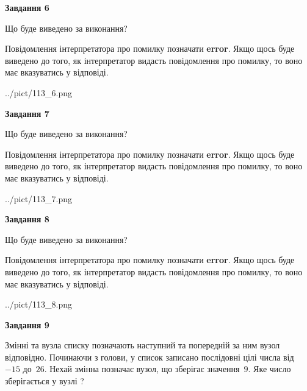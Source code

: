 \documentclass[12pt, ukrainian]{article}
\begin{document}
{\begin {large}
{\begin {center}\textbf{Завдання 6}\end {center}}\par
Що буде виведено за виконання?

Повідомлення інтерпретатора про помилку позначати \textbf{error}.
Якщо щось буде виведено до того, як інтерпретатор видасть повідомлення про помилку, 
то воно має вказуватись у відповіді. \par


\begin{center}
	{../pict/113_6.png}
\end{center}
\newpage

{\begin {center}\textbf{Завдання 7}\end {center}}\par
Що буде виведено за виконання?

Повідомлення інтерпретатора про помилку позначати \textbf{error}.
Якщо щось буде виведено до того, як інтерпретатор видасть повідомлення про помилку, 
то воно має вказуватись у відповіді. \par


\begin{center}
	{../pict/113_7.png}
\end{center}
\newpage

{\begin {center}\textbf{Завдання 8}\end {center}}\par
Що буде виведено за виконання?

Повідомлення інтерпретатора про помилку позначати \textbf{error}.
Якщо щось буде виведено до того, як інтерпретатор видасть повідомлення про помилку, 
то воно має вказуватись у відповіді. \par


\begin{center}
	{../pict/113_8.png}
\end{center}
\newpage

{\begin {center}\textbf{Завдання 9}\end {center}}\par
Змінні  та  вузла списку позначають наступний та попередній за ним вузол відповідно. Починаючи з голови, у список записано послідовні цілі числа від~$-15$ до~$26$. Нехай змінна  позначає вузол, що зберігає значення~$9$.
Яке число зберігається у вузлі  ?\par
\newpage


\end{large}}
\end{document}
